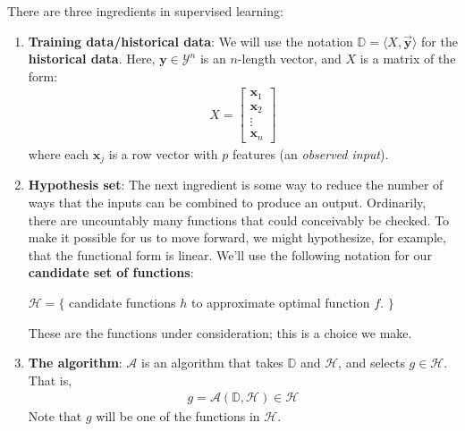 \documentclass[12pt, a4paper]{article}
\begin{document}
	There are three ingredients in supervised learning:
	\begin{enumerate}[label=(\arabic*)]
		\item \textbf{Training data/historical data}: We will use the notation
		$\mathbb{D}=\langle X, \vec{\textbf{y}}\rangle$ for the \textbf{historical data}.
		Here, $\textbf{y}\in \mathcal{Y}^n$ is an $n$-length vector, and
		$X$ is a matrix of the form:
		\begin{align*}
			X = \begin{bmatrix}
				\textbf{x}_1\\
				\textbf{x}_2\\
				\vdots\\
				\textbf{x}_n
			\end{bmatrix}
		\end{align*}
		where each $\textbf{x}_j$ is a row vector with $p$ features (an \textit{observed input}).
		\item \textbf{Hypothesis set}: The next ingredient is some way to reduce the number
		of ways that the inputs can be combined to produce an output. Ordinarily, there
		are uncountably many functions that could conceivably be checked. To make it possible
		for us to move forward, we might hypothesize, for example, that the functional form
		is linear. We'll use the following notation for our \textbf{candidate set of functions}:
		\begin{center}
			$\mathcal{H} = \{$ candidate functions $h$ to approximate optimal function $f$. $\}$
		\end{center}
		These are the functions under consideration; this is a choice we make.
		\item \textbf{The algorithm}: $\mathcal{A}$ is an algorithm that takes $\mathbb{D}$ and
		$\mathcal{H}$, and selects $g\in \mathcal{H}$. That is,
		\begin{align*}
			g= \mathcal{A}(\mathbb{D}, \mathcal{H})\in \mathcal{H}
		\end{align*}
		Note that $g$ will be one of the functions in $\mathcal{H}$.
	\end{enumerate}
\end{document}
